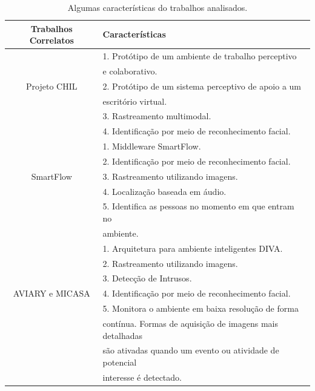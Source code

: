 	\begin{table}[h]
		\begin{center}
			\caption{Algumas características do trabalhos analisados.}
			\label{tab:trab-correlatos}
			\begin{tabular}{c|l}
				\hline \bf Trabalhos Correlatos & \bf Características \\
				\hline 						  & 1. Protótipo de um ambiente de trabalho perceptivo\\
														& e colaborativo. \\
				  		 Projeto CHIL & 2. Protótipo de um sistema perceptivo de apoio a um\\
				  									& escritório virtual. \\
				  									& 3. Rastreamento multimodal. \\
				  									& 4. Identificação por meio de reconhecimento facial. \\
															
				\hline  				 & 1. Middleware SmartFlow.\\
												 & 2. Identificação por meio de reconhecimento facial.\\
							SmartFlow	 & 3. Rastreamento utilizando imagens.\\
												 & 4. Localização baseada em áudio. \\
												 & 5. Identifica as pessoas no momento em que entram no\\
												 & ambiente.\\

				\hline  							 & 1. Arquitetura para ambiente inteligentes DIVA.\\
															 & 2. Rastreamento utilizando imagens.\\
															 & 3. Detecção de Intrusos.\\
							 AVIARY e MICASA & 4. Identificação por meio de reconhecimento facial.\\
															 & 5. Monitora o ambiente em baixa resolução de forma \\
															 & contínua. Formas de aquisição de imagens mais detalhadas\\
															 & são ativadas quando um evento ou atividade de potencial \\
															 & interesse é detectado. \\
				\hline
			\end{tabular}
		\end{center}
	\end{table}

